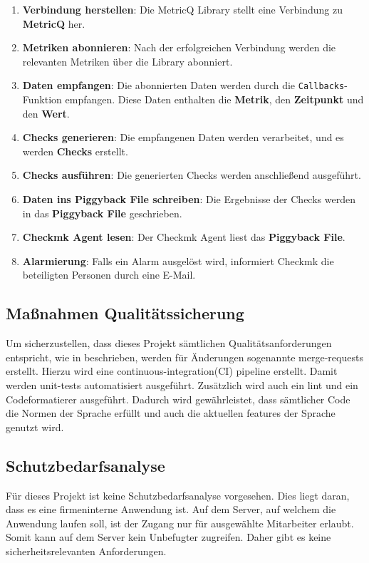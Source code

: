 \begin{enumerate}
  \item \textbf{Verbindung herstellen}: Die \Gls{MetricQ} Library stellt eine Verbindung zu \textbf{MetricQ} her.
  \item \textbf{Metriken abonnieren}: Nach der erfolgreichen Verbindung werden die relevanten Metriken über die Library abonniert.
  \item \textbf{Daten empfangen}: Die abonnierten Daten werden durch die \texttt{Callbacks}-Funktion empfangen. Diese Daten enthalten die \textbf{Metrik}, den \textbf{Zeitpunkt} und den \textbf{Wert}.
  \item \textbf{Checks generieren}: Die empfangenen Daten werden verarbeitet, und es werden \textbf{Checks} erstellt.
  \item \textbf{Checks ausführen}: Die generierten Checks werden anschließend ausgeführt.
  \item \textbf{Daten ins Piggyback File schreiben}: Die Ergebnisse der Checks werden in das \textbf{Piggyback File} geschrieben.
  \item \textbf{Checkmk Agent lesen}: Der \Gls{Checkmk} Agent liest das \textbf{Piggyback File}.
  \item \textbf{Alarmierung}: Falls ein Alarm ausgelöst wird, informiert \Gls{Checkmk} die beteiligten Personen durch eine E-Mail.
\end{enumerate}

\subsection{Maßnahmen Qualitätssicherung}
Um sicherzustellen, dass dieses Projekt sämtlichen Qualitätsanforderungen entspricht, wie in  beschrieben, werden für Änderungen sogenannte \Gls{merge-request}s erstellt.
Hierzu wird eine \Gls{continuous-integration}(\acrshort{CI}) \Gls{pipeline} erstellt.
Damit werden \Gls{unit-test}s automatisiert ausgeführt.
Zusätzlich wird auch ein \Gls{lint} und ein Codeformatierer ausgeführt.
Dadurch wird gewährleistet, dass sämtlicher Code die Normen der Sprache erfüllt und auch die aktuellen \Gls{feature}s der Sprache genutzt wird.

\subsection{Schutzbedarfsanalyse}
Für dieses Projekt ist keine Schutzbedarfsanalyse vorgesehen.
Dies liegt daran, dass es eine firmeninterne Anwendung ist.
Auf dem Server, auf welchem die Anwendung laufen soll, ist der Zugang nur für ausgewählte Mitarbeiter erlaubt.
Somit kann auf dem Server kein Unbefugter zugreifen.
Daher gibt es keine sicherheitsrelevanten Anforderungen.
